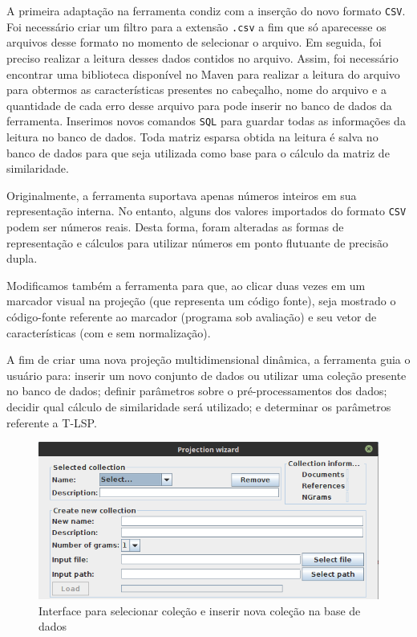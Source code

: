 		A primeira adaptação na ferramenta condiz com a inserção do novo formato \texttt{CSV}.
		Foi necessário criar um filtro para a extensão \texttt{.csv} a fim que só aparecesse
		os arquivos desse formato no momento de selecionar o arquivo. Em seguida, foi preciso
		realizar a leitura desses dados contidos no arquivo. Assim, foi necessário encontrar
		uma biblioteca disponível no Maven para realizar a leitura do arquivo para obtermos
		as características presentes no cabeçalho, nome do arquivo e a quantidade de cada
		erro desse arquivo para pode inserir no banco de dados da ferramenta. Inserimos novos
		comandos \texttt{SQL} para guardar todas as informações da leitura no banco de dados.
		Toda matriz esparsa obtida na leitura é salva no banco de dados para que seja
		utilizada como base para o cálculo da matriz de similaridade.
		
		Originalmente, a ferramenta suportava apenas números inteiros em sua representação
		interna. No entanto, alguns dos valores importados do formato \texttt{CSV} podem
		ser números reais. Desta forma, foram alteradas as formas de representação e cálculos
		para utilizar números em ponto flutuante de precisão dupla.
		
		Modificamos também a ferramenta para que, ao clicar duas vezes em um marcador visual
		na projeção (que representa um código fonte), seja mostrado o código-fonte referente
		ao marcador (programa sob avaliação) e
		seu vetor de características (com e sem normalização).
		
		A fim de criar uma nova projeção multidimensional dinâmica, a ferramenta guia o
		usuário para: inserir um novo conjunto de dados ou utilizar uma coleção presente
		no banco de dados; definir parâmetros sobre o pré-processamentos dos dados; decidir
		qual cálculo de similaridade será utilizado; e determinar os parâmetros referente
		a \acs{T-LSP}.
	
		\begin{figure}[b]
			\centering
			\includegraphics[width=0.75\linewidth]{imagem/createDatabase}
			\caption{Interface para selecionar coleção e inserir nova coleção na base de dados}
			\label{fig:createDatabase}
		\end{figure}
		
